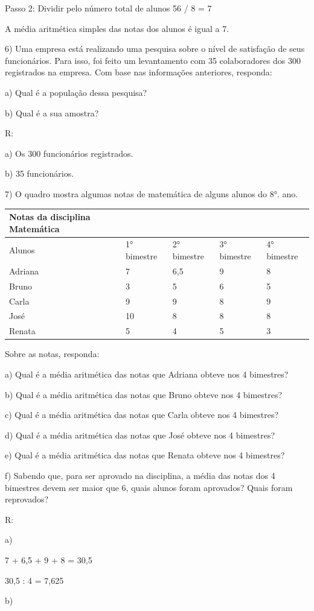 Passo 2: Dividir pelo número total de alunos 56 / 8 = 7

A média aritmética simples das notas dos alunos é igual a 7.

6) Uma empresa está realizando uma pesquisa sobre o nível de satisfação
de seus funcionários. Para isso, foi feito um levantamento com 35
colaboradores dos 300 registrados na empresa. Com base nas informações
anteriores, responda:

a) Qual é a população dessa pesquisa?

b) Qual é a sua amostra?

R:

a) Os 300 funcionários registrados.

b) 35 funcionários.

7) O quadro mostra algumas notas de matemática de alguns alunos do 8°.
ano.


\begin{longtable}[]{@{}lllll@{}}
\toprule
Notas da disciplina Matemática & & & &\tabularnewline
\midrule
\endhead
Alunos & 1° bimestre & 2° bimestre & 3° bimestre & 4°
bimestre\tabularnewline
Adriana & 7 & 6,5 & 9 & 8\tabularnewline
Bruno & 3 & 5 & 6 & 5\tabularnewline
Carla & 9 & 9 & 8 & 9\tabularnewline
José & 10 & 8 & 8 & 8\tabularnewline
Renata & 5 & 4 & 5 & 3\tabularnewline
\bottomrule
\end{longtable}

Sobre as notas, responda:

a) Qual é a média aritmética das notas que Adriana obteve nos 4
bimestres?

b) Qual é a média aritmética das notas que Bruno obteve nos 4 bimestres?

c) Qual é a média aritmética das notas que Carla obteve nos 4 bimestres?

d) Qual é a média aritmética das notas que José obteve nos 4 bimestres?

e) Qual é a média aritmética das notas que Renata obteve nos 4
bimestres?

f) Sabendo que, para ser aprovado na disciplina, a média das notas dos 4
bimestres devem ser maior que 6, quais alunos foram aprovados? Quais
foram reprovados?

R:

a)

7 + 6,5 + 9 + 8 = 30,5

30,5 : 4 = 7,625

b)

